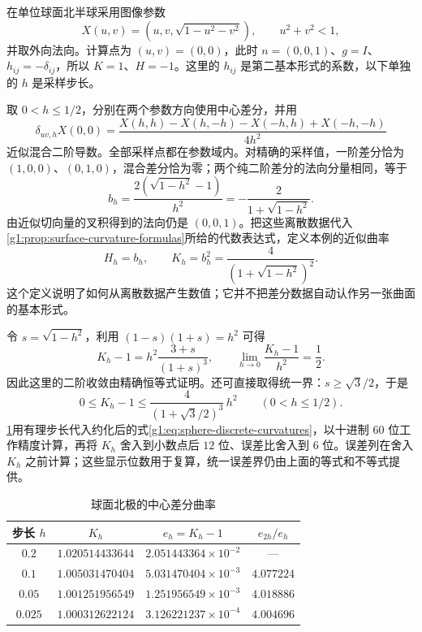 \begin{example}\label{g1:exm:sphere-difference-curvature}
	在单位球面北半球采用图像参数
	\[
		X(u,v)=(u,v,\sqrt{1-u^2-v^2}),\qquad u^2+v^2<1,
	\]
	并取外向法向。计算点为 \((u,v)=(0,0)\)，此时 \(n=(0,0,1)\)、\(g=I\)、\(h_{ij}=-\delta_{ij}\)，所以 \(K=1\)、\(H=-1\)。这里的 \(h_{ij}\) 是第二基本形式的系数，以下单独的 \(h\) 是采样步长。

	取 \(0<h\le1/2\)，分别在两个参数方向使用中心差分，并用
	\[
		\delta_{uv,h}X(0,0)=
		\frac{X(h,h)-X(h,-h)-X(-h,h)+X(-h,-h)}{4h^2}
	\]
	近似混合二阶导数。全部采样点都在参数域内。对精确的采样值，一阶差分恰为 \((1,0,0)\)、\((0,1,0)\)，混合差分恰为零；两个纯二阶差分的法向分量相同，等于
	\begin{equation}\label{g1:eq:sphere-second-difference}
		b_h=\frac{2(\sqrt{1-h^2}-1)}{h^2}
		=-\frac{2}{1+\sqrt{1-h^2}}.
	\end{equation}
	由近似切向量的叉积得到的法向仍是 \((0,0,1)\)。把这些离散数据代入\cref{g1:prop:surface-curvature-formulas}所给的代数表达式，定义本例的近似曲率
	\begin{equation}\label{g1:eq:sphere-discrete-curvatures}
		H_h=b_h,\qquad K_h=b_h^2
		=\frac4{(1+\sqrt{1-h^2})^2}.
	\end{equation}
	这个定义说明了如何从离散数据产生数值；它并不把差分数据自动认作另一张曲面的基本形式。

	令 \(s=\sqrt{1-h^2}\)，利用 \((1-s)(1+s)=h^2\) 可得
	\begin{equation}\label{g1:eq:sphere-discrete-curvature-error}
		K_h-1=h^2\frac{3+s}{(1+s)^3},\qquad
		\lim_{h\to0}\frac{K_h-1}{h^2}=\frac12.
	\end{equation}
	因此这里的二阶收敛由精确恒等式证明。还可直接取得统一界：\(s\ge\sqrt3/2\)，于是
	\[
		0\le K_h-1\le
		\frac4{(1+\sqrt3/2)^3}\,h^2\qquad(0<h\le1/2).
	\]
	\cref{g1:tab:sphere-discrete-curvature}用有理步长代入约化后的式\eqref{g1:eq:sphere-discrete-curvatures}，以十进制 \(60\) 位工作精度计算，再将 \(K_h\) 舍入到小数点后 \(12\) 位、误差比舍入到 \(6\) 位。误差列在舍入 \(K_h\) 之前计算；这些显示位数用于复算，统一误差界仍由上面的等式和不等式提供。
\end{example}

\begin{table}[htbp]
	\centering
	\caption{球面北极的中心差分曲率}
	\label{g1:tab:sphere-discrete-curvature}
	\begin{tabular}{cccc}
		\toprule
		步长 \(h\) & \(K_h\) & \(e_h=K_h-1\) & \(e_{2h}/e_h\)\\
		\midrule
		\(0.2\) & \(1.020514433644\) & \(2.051443364\times10^{-2}\) & —\\
		\(0.1\) & \(1.005031470404\) & \(5.031470404\times10^{-3}\) & \(4.077224\)\\
		\(0.05\) & \(1.001251956549\) & \(1.251956549\times10^{-3}\) & \(4.018886\)\\
		\(0.025\) & \(1.000312622124\) & \(3.126221237\times10^{-4}\) & \(4.004696\)\\
		\bottomrule
	\end{tabular}
\end{table}

